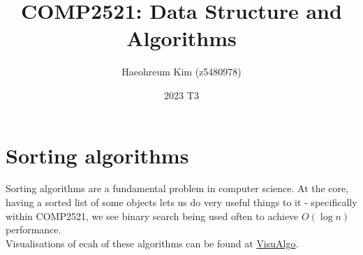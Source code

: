 \documentclass[14]{article}
\title{COMP2521: Data Structure and Algorithms}
\author{Haeohreum Kim (z5480978)}
\date{2023 T3}
\begin{document}
\begin{titlingpage}
\maketitle
\tableofcontents
\end{titlingpage}
\newpage
\section{Sorting algorithms}
Sorting algorithms are a fundamental problem in computer science. At the core, having a sorted list of some objects lets us
do very useful things to it - specifically within COMP2521, we see binary search being used often to achieve $O(\log n)$ performance. \\ 
Visualisations of ecah of these algorithms can be found at \href{https://visualgo.net/en/sorting}{VisuAlgo}.
\end{document}
